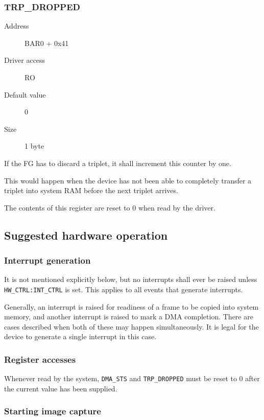 \documentclass[12pt]{article}
\begin{document}
\subsubsection{TRP\_DROPPED}

\begin{description}
\item[Address] BAR0 + 0x41
\item[Driver access] RO
\item[Default value] 0
\item[Size] 1 byte
\end{description}

If the FG has to discard a triplet, it shall increment this counter by one.

This would happen when the device has not been able to completely transfer a triplet into system RAM before the next triplet arrives.

The contents of this register are reset to 0 when read by the driver.

\subsection{Suggested hardware operation}

\subsubsection{Interrupt generation}

It is not mentioned explicitly below, but no interrupts shall ever be raised unless \texttt{HW\_CTRL:INT\_CTRL} is set. This applies to all events that generate interrupts.

Generally, an interrupt is raised for readiness of a frame to be copied into system memory, and another interrupt is raised to mark a DMA completion. There are cases described when both of these may happen simultaneously. It is legal for the device to generate a single interrupt in this case.

\subsubsection{Register accesses}

Whenever read by the system, \texttt{DMA\_STS} and \texttt{TRP\_DROPPED} must be reset to 0 after the current value has been supplied.

\subsubsection{Starting image capture}
\end{document}
